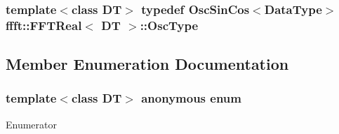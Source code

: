 \subsubsection[{\texorpdfstring{Osc\+Type}{OscType}}]{\setlength{\rightskip}{0pt plus 5cm}template$<$class DT$>$ typedef {\bf Osc\+Sin\+Cos}$<${\bf Data\+Type}$>$ {\bf ffft\+::\+F\+F\+T\+Real}$<$ DT $>$\+::{\bf Osc\+Type}\hspace{0.3cm}{\ttfamily [private]}}\hypertarget{classffft_1_1FFTReal_a3b9f6dae05435b3696c6c84155e0953a}{}\label{classffft_1_1FFTReal_a3b9f6dae05435b3696c6c84155e0953a}


\subsection{Member Enumeration Documentation}
\subsubsection[{\texorpdfstring{anonymous enum}{anonymous enum}}]{\setlength{\rightskip}{0pt plus 5cm}template$<$class DT$>$ anonymous enum}\hypertarget{classffft_1_1FFTReal_a39f5a2ec14c15f9198268500716e5dba}{}\label{classffft_1_1FFTReal_a39f5a2ec14c15f9198268500716e5dba}
\begin{Desc}
\item[Enumerator]\par
\begin{description}
\item[{\em 
M\+A\+X\+\_\+\+B\+I\+T\+\_\+\+D\+E\+P\+TH\hypertarget{classffft_1_1FFTReal_a39f5a2ec14c15f9198268500716e5dbaabec37ae38b07b6e3e1230562f01882a2}{}\label{classffft_1_1FFTReal_a39f5a2ec14c15f9198268500716e5dbaabec37ae38b07b6e3e1230562f01882a2}
}]\end{description}
\end{Desc}
